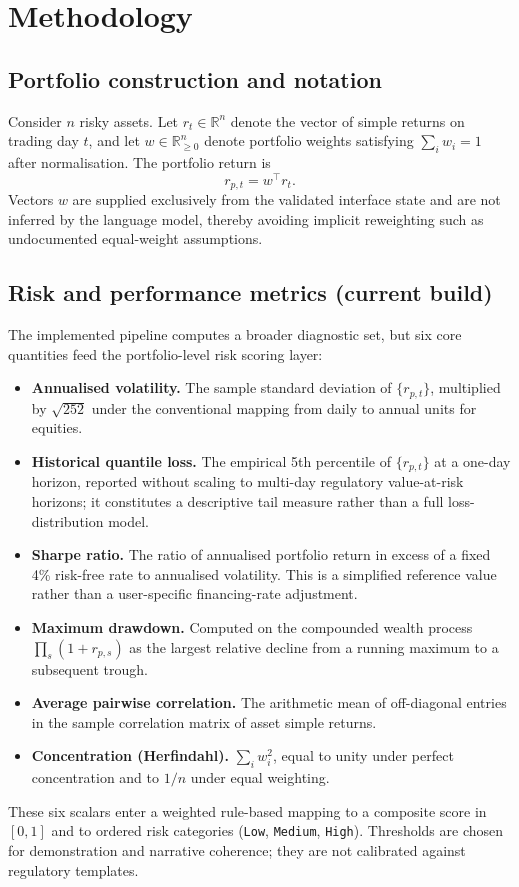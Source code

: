 \section{Methodology}
\label{sec:methodology}

\subsection{Portfolio construction and notation}
Consider $n$ risky assets. Let $r_t \in \mathbb{R}^n$ denote the vector of simple returns on trading day $t$, and let $w \in \mathbb{R}^n_{\ge 0}$ denote portfolio weights satisfying $\sum_i w_i = 1$ after normalisation. The portfolio return is
\begin{equation*}
r_{p,t} = w^\top r_t .
\end{equation*}
Vectors $w$ are supplied exclusively from the validated interface state and are not inferred by the language model, thereby avoiding implicit reweighting such as undocumented equal-weight assumptions.

\subsection{Risk and performance metrics (current build)}
The implemented pipeline computes a broader diagnostic set, but six core quantities feed the portfolio-level risk scoring layer:
\begin{itemize}
    \item \textbf{Annualised volatility.} The sample standard deviation of $\{r_{p,t}\}$, multiplied by $\sqrt{252}$ under the conventional mapping from daily to annual units for equities.
    \item \textbf{Historical quantile loss.} The empirical 5th percentile of $\{r_{p,t}\}$ at a one-day horizon, reported without scaling to multi-day regulatory value-at-risk horizons; it constitutes a descriptive tail measure rather than a full loss-distribution model.
    \item \textbf{Sharpe ratio.} The ratio of annualised portfolio return in excess of a fixed 4\% risk-free rate to annualised volatility. This is a simplified reference value rather than a user-specific financing-rate adjustment.
    \item \textbf{Maximum drawdown.} Computed on the compounded wealth process $\prod_s (1+r_{p,s})$ as the largest relative decline from a running maximum to a subsequent trough.
    \item \textbf{Average pairwise correlation.} The arithmetic mean of off-diagonal entries in the sample correlation matrix of asset simple returns.
    \item \textbf{Concentration (Herfindahl).} $\sum_i w_i^2$, equal to unity under perfect concentration and to $1/n$ under equal weighting.
\end{itemize}
These six scalars enter a weighted rule-based mapping to a composite score in $[0,1]$ and to ordered risk categories (\texttt{Low}, \texttt{Medium}, \texttt{High}). Thresholds are chosen for demonstration and narrative coherence; they are not calibrated against regulatory templates.

